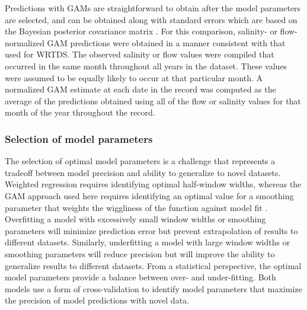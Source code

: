 \documentclass{svjour3}\usepackage[]{graphicx}\usepackage[]{color}
\begin{document}
Predictions with \acp{GAM} are straightforward to obtain after the model parameters are selected, and can be obtained along with standard errors which are based on the Bayesian posterior covariance matrix \cite{Wood06}. For this comparison, salinity- or flow-normalized \ac{GAM} predictions were obtained in a manner consistent with that used for \ac{WRTDS}. The observed salinity or flow values were compiled that occurred in the same month throughout all years in the dataset. These values were assumed to be equally likely to occur at that particular month.  A normalized \ac{GAM} estimate at each date in the record was computed as the average of the predictions obtained using all of the flow or salinity values for that month of the year throughout the record. 

\subsubsection{Selection of model parameters}

The selection of optimal model parameters is a challenge that represents a tradeoff between model precision and ability to generalize to novel datasets.  Weighted regression requires identifying optimal half-window widths, whereas the \ac{GAM} approach used here requires identifying an optimal value for a smoothing parameter that weights the wiggliness of the function against model fit \cite{Wood06}.  Overfitting a model with excessively small window widths or smoothing parameters will minimize prediction error but prevent extrapolation of results to different datasets. Similarly, underfitting a model with large window widths or smoothing parameters will reduce precision but will improve the ability to generalize results to different datasets. From a statistical perspective, the optimal model parameters provide a balance between over- and under-fitting.  Both models use a form of cross-validation to identify model parameters that maximize the precision of model predictions with novel data.   
\end{document}
